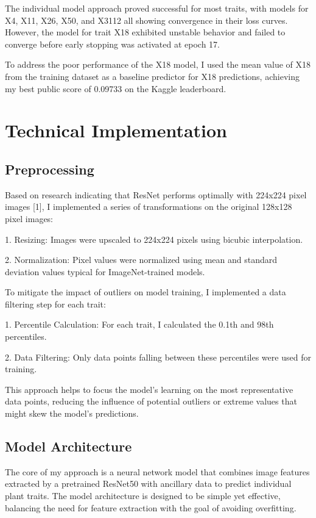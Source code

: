 \documentclass{article}
\begin{document}
The individual model approach proved successful for most traits, with models for X4, X11, X26, X50, and X3112 all showing convergence in their loss curves. However, the model for trait X18 exhibited unstable behavior and failed to converge before early stopping was activated at epoch 17.

To address the poor performance of the X18 model, I used the mean value of X18 from the training dataset as a baseline predictor for X18 predictions, achieving my best public score of 0.09733 on the Kaggle leaderboard.

\section{Technical Implementation}

\subsection{Preprocessing}

Based on research indicating that ResNet performs optimally with 224x224 pixel images [1], I implemented a series of transformations on the original 128x128 pixel images:

1. Resizing: Images were upscaled to 224x224 pixels using bicubic interpolation.

2. Normalization: Pixel values were normalized using mean and standard deviation values typical for ImageNet-trained models.

To mitigate the impact of outliers on model training, I implemented a data filtering step for each trait:

1. Percentile Calculation: For each trait, I calculated the 0.1th and 98th percentiles.

2. Data Filtering: Only data points falling between these percentiles were used for training.

This approach helps to focus the model's learning on the most representative data points, reducing the influence of potential outliers or extreme values that might skew the model's predictions.

\subsection{Model Architecture}

The core of my approach is a neural network model that combines image features extracted by a pretrained ResNet50 with ancillary data to predict individual plant traits. The model architecture is designed to be simple yet effective, balancing the need for feature extraction with the goal of avoiding overfitting. 
\end{document}
